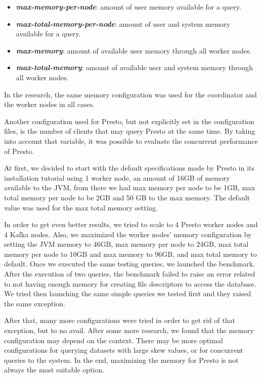 \documentclass[conference]{IEEEtran}
\begin{document}
\begin{itemize}
    \item \textbf{\textit{max-memory-per-node}}: amount of user memory available for a query.
    \item \textbf{\textit{max-total-memory-per-node}}: amount of user and system memory available for a query.
    \item \textbf{\textit{max-memory}}: amount of available user memory through all worker nodes.
    \item \textbf{\textit{max-total-memory}}: amount of available user and system memory through all worker nodes.
\end{itemize}

In the research, the same memory configuration was used for the coordinator and the worker nodes in all cases.

Another configuration used for Presto, but not explicitly set in the configuration files, is the number of clients that may query Presto at the same time. By taking into account that variable, it was possible to evaluate the concurrent performance of Presto.

At first, we decided to start with the default specifications made by Presto in its installation tutorial \cite{the-presto-foundation-no-date} using 1 worker node, an amount of 16GB of memory available to the JVM, from there we had max memory per node to be 1GB, max total memory per node to be 2GB and 50 GB to the max memory. The default value was used for the max total memory setting.

In order to get even better results, we tried to scale to 4 Presto worker nodes and 4 Kafka nodes. Also, we maximized the worker nodes' memory configuration by setting the JVM memory to 46GB, max memory per node to 24GB, max total memory per node to 10GB and max memory to 96GB, and max total memory to default.
Once we executed the same testing queries, we launched the benchmark. After the execution of two queries, the benchmark failed to raise an error related to not having enough memory for creating file descriptors to access the database. We tried then launching the same simple queries we tested first and they raised the same exception.

After that, many more configurations were tried in order to get rid of that exception, but to no avail. After some more research, we found that the memory configuration may depend on the context. There may be more optimal configurations for querying datasets with large skew values, or for concurrent queries to the system. In the end, maximizing the memory for Presto is not always the most suitable option. \cite{saversky-2020}
\end{document}
